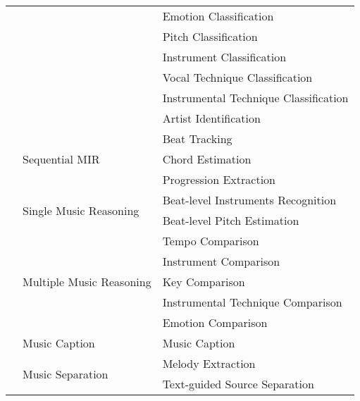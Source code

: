 \begin{longtable}{p{1.5cm}p{6cm}p{7cm}}
                           &             & Emotion Classification               \\ 
                           &             & Pitch Classification                 \\ 
                           &             & Instrument Classification            \\ 
                           &             & Vocal Technique Classification       \\ 
                           &             & Instrumental Technique Classification \\ 
                           &             & Artist Identification \\ 
                    \cline{2-3} %
                         & \multirow{3}{*}{Sequential MIR} & Beat Tracking  \\  %
                         &                 & Chord Estimation  \\
                         &                 & Progression Extraction \\
                     \cline{2-3} %
                         & \multirow{2}{*}{Single Music Reasoning} & Beat-level Instruments Recognition  \\  %
                         &                         & Beat-level Pitch Estimation  \\  
                     \cline{2-3} %
                         & \multirow{5}{*}{Multiple Music Reasoning} & Tempo Comparison  \\
                         &                           & Instrument Comparison  \\
                         &                           & Key Comparison \\
                         &                           & Instrumental Technique Comparison \\
                         &                           & Emotion Comparison  \\
                     \cline{2-3} %
                         & Music Caption & Music Caption  \\
                     \cline{2-3} %
                         & \multirow{2}{*}{Music Separation}& Melody Extraction \\
                         &                 & Text-guided Source Separation \\

\end{longtable}
